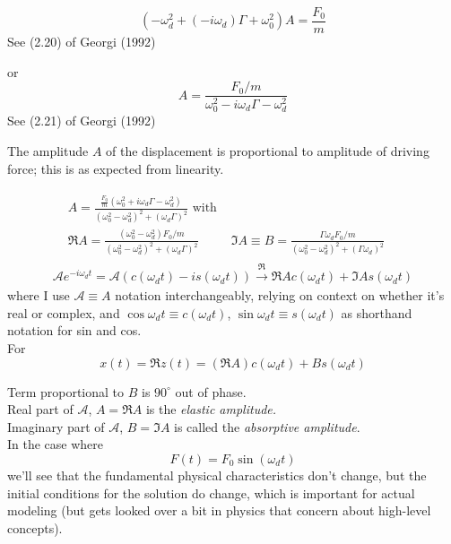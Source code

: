 \begin{equation}
	(-\omega_d^2 + (-i \omega_d)\Gamma + \omega_0^2)A = \frac{F_0}{m} 
\end{equation}
See (2.20) of Georgi (1992) \cite{agat:Geor1992}

or
\begin{equation}\label{agat:Eq:ForcedOscillationSteadyStateSolutionAmplitude}
	A = \frac{ F_0 / m }{ \omega_0^2 - i\omega_d \Gamma - \omega_d^2}
\end{equation}
See (2.21) of Georgi (1992) \cite{agat:Geor1992}

The amplitude $A$ of the displacement is proportional to amplitude of driving force; this is as expected from linearity.

\[
\begin{gathered}
	\begin{aligned}
		& A = \frac{ \frac{F_0}{m} (\omega_0^2 + i \omega_d \Gamma - \omega_d^2 )}{ (\omega_0^2 - \omega_d^2)^2 + (\omega_d \Gamma)^2 } \text{ with } & \\
		& \Re{A} = \frac{ (\omega_0^2 - \omega_d^2) F_0/m }{(\omega_0^2 - \omega_d^2)^2 + (\omega_d \Gamma)^2} & \Im{A} \equiv B = \frac{ \Gamma \omega_d F_0 /m }{ (\omega_0^2 - \omega_d^2)^2 + (\Gamma \omega_d )^2 }
	\end{aligned} \\
	\mathcal{A} e^{- i\omega_d t} = \mathcal{A} ( c(\omega_dt) - i s(\omega_dt)) \xrightarrow{\Re} \Re{A } c(\omega_d t) + \Im{A} s(\omega_d t)
\end{gathered}
\]
where I use $\mathcal{A} \equiv A$ notation interchangeably, relying on context on whether it's real or complex, and $\cos{\omega_d t} \equiv c(\omega_d t)$, $\sin{\omega_d t} \equiv s(\omega_d t)$ as shorthand notation for sin and cos. \\

For 
\[
x(t) = \Re{z(t)} = (\Re{A}) c(\omega_d t) + Bs(\omega_d t)
\]

Term proportional to $B$ is $90^{\circ}$ out of phase. \\
Real part of $\mathcal{A}$, $A = \Re{A}$ is the \emph{elastic amplitude.} \\
Imaginary part of $\mathcal{A}$, $B = \Im{A}$ is called the \emph{absorptive amplitude}. \\

In the case where 
\[
F(t) = F_0 \sin{(\omega_dt)}
\]
we'll see that the fundamental physical characteristics don't change, but the initial conditions for the solution do change, which is important for actual modeling (but gets looked over a bit in physics that concern about high-level concepts).

